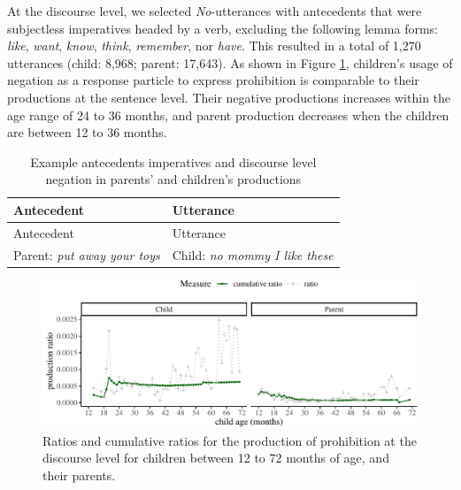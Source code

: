 \documentclass[
  english,
  man,floatsintext]{apa6}
\begin{document}
At the discourse level, we selected \emph{No}-utterances with antecedents that were subjectless imperatives headed by a verb, excluding the following lemma forms: \emph{like}, \emph{want}, \emph{know}, \emph{think}, \emph{remember}, nor \emph{have}. This resulted in a total of 1,270 utterances (child: 8,968; parent: 17,643). As shown in Figure \ref{fig:prohibitiondiscourse}, children's usage of negation as a response particle to express prohibition is comparable to their productions at the sentence level. Their negative productions increases within the age range of 24 to 36 months, and parent production decreases when the children are between 12 to 36 months.

\begin{longtable}[]{@{}ll@{}}
\caption{\label{tab:disprohib} Example antecedents imperatives and discourse level negation in parents' and children's productions}\tabularnewline
\toprule
Antecedent & Utterance \\
\midrule
\endfirsthead
\toprule
Antecedent & Utterance \\
\midrule
\endhead
Parent: \emph{put away your toys} & Child: \emph{no mommy I like these} \\
\bottomrule
\end{longtable}

\begin{figure}[H]

{\centering \includegraphics{neg_construction_article_files/figure-latex/prohibitiondiscourse-1} 

}

\caption{Ratios and cumulative ratios for the production of prohibition at the discourse level for children between 12 to 72 months of age, and their parents.}\label{fig:prohibitiondiscourse}
\end{figure}
\end{document}
